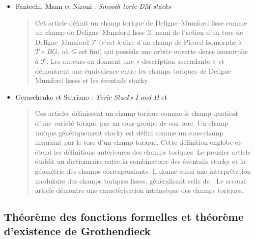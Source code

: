 \begin{itemize}
\item Fantechi, Mann et Nironi : \emph{Smooth toric DM stacks}
\cite{fmn}
\begin{quote}
Cet article définit un champ torique de Deligne--Mumford lisse comme un champ
de Deligne--Mumford lisse $\mathcal{X}$ muni de l'action d'un tore de
Deligne--Mumford $\mathcal{T}$ (c'est-à-dire d'un champ de Picard isomorphe à
$T \times BG$, où $G$ est fini) qui possède une orbite ouverte dense isomorphe
à $\mathcal{T}$. Les auteurs en donnent une « description ascendante » et
démontrent une équivalence entre les champs toriques de Deligne--Mumford
lisses et les éventails stacky.
\end{quote}
\item Geraschenko et Satriano : \emph{Toric Stacks I and II}
\cite{gs_toric1} et \cite{gs_toric2}
\begin{quote}
Ces articles définissent un champ torique comme le champ quotient d'une
variété torique par un sous-groupe de son tore. Un champ torique génériquement
stacky est défini comme un sous-champ invariant par le tore d'un champ
torique. Cette définition englobe et étend les définitions antérieures des
champs toriques. Le premier article établit un dictionnaire entre la
combinatoire des éventails stacky et la géométrie des champs
correspondants. Il donne aussi une interprétation modulaire des champs
toriques lisses, généralisant celle de \cite{perroni}. Le second article
démontre une caractérisation intrinsèque des champs toriques.
\end{quote}
\end{itemize}



\subsection{Théorème des fonctions formelles et théorème d'existence de Grothendieck}
\label{subsection-theorem-formal-functions}

